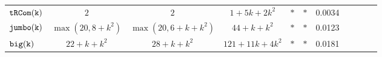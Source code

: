 {\begin {table}[t]
\begin{center}
{\begin{tabular}{ | >{\tiny}l | c | c | c | c | c | c | c | c | c  |c}
         $  \mathtt{tRCom(k)}$ &  $2$ &  $ 2$ & $ 1 + 5k + 2 k^2 $  &  $ * $   &   $* $  & 0.0034  \\ %
         $  \mathtt{{jumbo(k)}}$&  $ \max(20, 8+k^2)$  & $  \max(20, 6+k+k^2)$   &   $ {44+k+k^2} $  &  $ * $   &  $* $ & 0.0123 \\%
         $  {\mathtt{big(k)}} $&  $22+k+k^2$  &   $28 + k + k^2$ &  $121+11k+4k^2 $  &  $ * $   &  $* $  & 0.0181 \\ %
        \hline \hline 
        \end{tabular}
}
\end{center}
\end{table}
}


